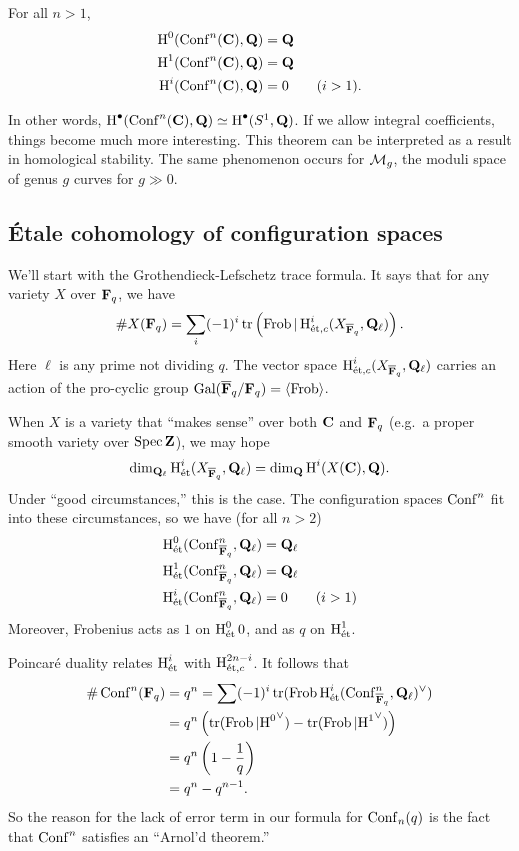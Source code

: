 \begin{theorem}[Arnol'd]
For all $n>1$, 
\begin{align*}
  \h^0(\conf^n(\dC),\dQ) &=\dQ \\
  \h^1(\conf^n(\dC),\dQ) &= \dQ \\
  \h^i(\conf^n(\dC),\dQ) &= 0 \qquad (i>1) .
\end{align*}
\end{theorem}
In other words, $\h^\bullet(\conf^n(\dC),\dQ) \simeq \h^\bullet(S^1,\dQ)$. If 
we allow integral coefficients, things become much more interesting. This 
theorem can be interpreted as a result in homological stability. The same 
phenomenon occurs for $\cM_g$, the moduli space of genus $g$ curves for 
$g\gg 0$. 





\subsection{\'Etale cohomology of configuration spaces}

We'll start with the Grothendieck-Lefschetz trace formula. It says that for any 
variety $X$ over $\dF_q$, we have 
\[
  \# X(\dF_q) = \sum_i (-1)^i \trace\left(\frob|\h_{\et,c}^i(X_{\bar\dF_q},\dQ_\ell)\right) .
\]
Here $\ell$ is any prime not dividing $q$. The vector space 
$\h_{\et,c}^i(X_{\bar\dF_q},\dQ_\ell)$ carries an action of the pro-cyclic 
group $\gal(\bar\dF_q/\dF_q) = \langle \frob\rangle$. 

When $X$ is a variety that ``makes sense'' over both $\dC$ and $\dF_q$ (e.g.\ 
a proper smooth variety over $\spec\dZ$), we may hope 
\[
  \dim_{\dQ_\ell} \h^i_\et(X_{\bar\dF_q},\dQ_\ell) = \dim_\dQ \h^i(X(\dC),\dQ) .
\]
Under ``good circumstances,'' this is the case. The configuration spaces 
$\conf^n$ fit into these circumstances, so we have (for all $n>2$) 
\begin{align*}
  \h_\et^0(\conf^n_{\bar\dF_q},\dQ_\ell) &= \dQ_\ell \\
  \h_\et^1(\conf^n_{\bar\dF_q},\dQ_\ell) &= \dQ_\ell \\
  \h_\et^i(\conf^n_{\bar\dF_q},\dQ_\ell) &= 0 \qquad (i>1)
\end{align*}
Moreover, Frobenius acts as $1$ on $\h_\et^00$, and as $q$ on $\h_\et^1$. 

Poincar\'e duality relates $\h_\et^i$ with $\h^{2n-i}_{\et,c}$. It follows 
that 
\begin{align*}
  \# \conf^n(\dF_q) &= q^n = \sum (-1)^i \trace(\frob\h^i_\et(\conf^n_{\bar\dF_q},\dQ_\ell)^\vee) \\
    &= q^n\left(\trace(\frob|{\h^0}^\vee) - \trace(\frob|{\h^1}^\vee)\right) \\
    &= q^n\left(1-\frac 1 q\right) \\
    &= q^n-q^{n-1} .
\end{align*}
So the reason for the lack of error term in our formula for $\conf_n(q)$ is the 
fact that $\conf^n$ satisfies an ``Arnol'd theorem.'' 




